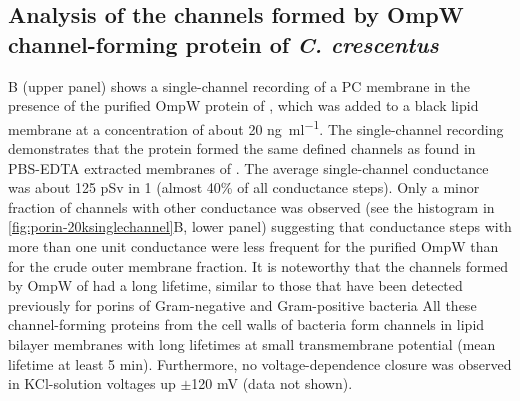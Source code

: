 \subsection{Analysis of the channels formed by OmpW channel-forming protein of \textit{C. crescentus}}

B (upper panel) shows a single-channel recording of a \ac{PC} membrane in the presence of the purified OmpW protein of \caulobacter, which was added to a black lipid membrane at a concentration of about 20 \si{\nano\gram\per\milli\litre}. The single-channel recording demonstrates that the protein formed the same defined channels as found in \ac{PBS}-\ac{EDTA} extracted membranes of \caulobacter. The average single-channel conductance was about 125 \si{\pico\sievert} in 1 \si{\molar}  (almost 40\% of all conductance steps). Only a minor fraction of channels with other conductance was observed (see the histogram in \cref{fig:porin-20ksinglechannel}B, lower panel) suggesting that conductance steps with more than one unit conductance were less frequent for the purified OmpW than for the crude outer membrane fraction. It is noteworthy that the channels formed by OmpW of \caulobacter had a long lifetime, similar to those that have been detected previously for porins of Gram-negative and Gram-positive bacteria All these channel-forming proteins from the cell walls of bacteria form channels in lipid bilayer membranes with long lifetimes at small transmembrane potential (mean lifetime at least 5 min). Furthermore, no voltage-dependence closure was observed in KCl-solution voltages up $\pm$120 mV (data not shown). 

